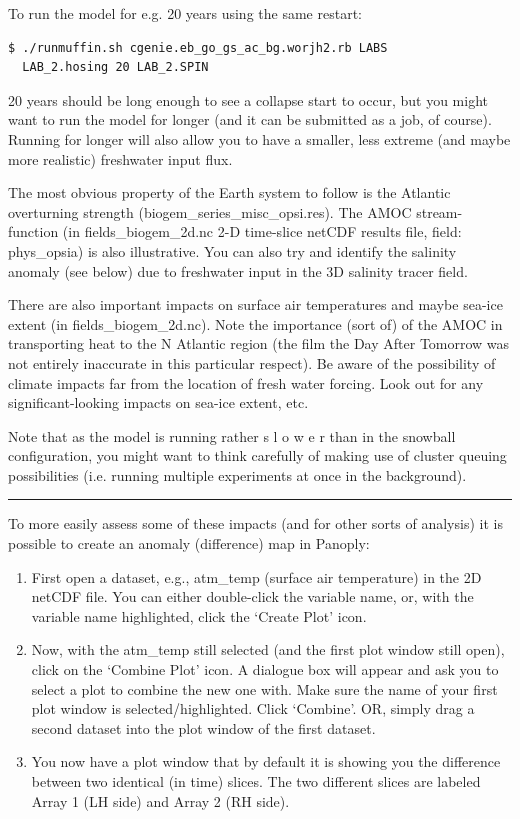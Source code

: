 \documentclass[11pt,fleqn]{book} %
\begin{document}
To run the model for e.g. 20 years using the same restart:

\begin{verbatim}
$ ./runmuffin.sh cgenie.eb_go_gs_ac_bg.worjh2.rb LABS
  LAB_2.hosing 20 LAB_2.SPIN
\end{verbatim}

20 years should be long enough to see a collapse start to occur, but you might want to run the model for longer (and it can be submitted as a job, of course). Running for longer will also allow you to have a smaller, less extreme (and maybe more realistic) freshwater input flux.

The most obvious property of the Earth system to follow is the Atlantic overturning strength (biogem\_series\_misc\_opsi.res). The AMOC stream-function (in fields\_biogem\_2d.nc 2-D time-slice netCDF results file, field: phys\_opsia) is also illustrative. You can also try and identify the salinity anomaly (see below) due to freshwater input in the 3D salinity tracer field.

There are also important impacts on surface air temperatures and maybe sea-ice extent (in fields\_biogem\_2d.nc). Note the importance (sort of) of the AMOC in transporting heat to the N Atlantic region (the film the Day After Tomorrow was not entirely inaccurate in this particular respect). Be aware of the possibility of climate impacts far from the location of fresh water forcing. Look out for any significant-looking impacts on sea-ice extent, etc.

Note that as the model is running rather s l o w e r than in the snowball configuration, you might want to think carefully of making use of cluster queuing possibilities (i.e. running multiple experiments at once in the background).

\hfill \break
\noindent\rule{4cm}{0.1mm}
\hfill \break

To more easily assess some of these impacts (and for other sorts of analysis) it is possible to create an anomaly (difference) map in Panoply:

\begin{enumerate}[noitemsep]
\item  First open a dataset, e.g., atm\_temp (surface air temperature) in the 2D netCDF file. You can either double-click the variable name, or, with the variable name highlighted, click the ‘Create Plot’ icon.
\item Now, with the atm\_temp still selected (and the first plot window still open), click on the ‘Combine Plot’ icon. A dialogue box will appear and ask you to select a plot to combine the new one with. Make sure the name of your first plot window is selected/highlighted. Click ‘Combine’. OR, simply drag a second dataset into the plot window of the first dataset.
\item You now have a plot window that by default it is showing you the difference between two identical (in time) slices. The two different slices are labeled Array 1 (LH side) and Array 2 (RH side).
\end{enumerate}
\end{document}
